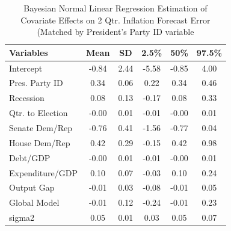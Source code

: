 \documentclass[a4paper]{article}\usepackage{graphicx, color}
\begin{document}
\begin{table}[ht]
\begin{center}
\caption{Bayesian Normal Linear Regression Estimation of Covariate Effects on 2 Qtr. Inflation Forecast Error (Matched by President's Party ID variable}
\label{OutputPB}
{\small
\begin{tabular}{lccccc}
  \hline
Variables & Mean & SD & 2.5\% & 50\% & 97.5\% \\ 
  \hline
Intercept & -0.84 & 2.44 & -5.58 & -0.85 & 4.00 \\ 
  Pres. Party ID & 0.34 & 0.06 & 0.22 & 0.34 & 0.46 \\ 
  Recession & 0.08 & 0.13 & -0.17 & 0.08 & 0.33 \\ 
  Qtr. to Election & -0.00 & 0.01 & -0.01 & -0.00 & 0.01 \\ 
  Senate Dem/Rep & -0.76 & 0.41 & -1.56 & -0.77 & 0.04 \\ 
  House Dem/Rep & 0.42 & 0.29 & -0.15 & 0.42 & 0.98 \\ 
  Debt/GDP & -0.00 & 0.01 & -0.01 & -0.00 & 0.01 \\ 
  Expenditure/GDP & 0.10 & 0.07 & -0.03 & 0.10 & 0.24 \\ 
  Output Gap & -0.01 & 0.03 & -0.08 & -0.01 & 0.05 \\ 
  Global Model & -0.01 & 0.12 & -0.24 & -0.01 & 0.23 \\ 
  sigma2 & 0.05 & 0.01 & 0.03 & 0.05 & 0.07 \\ 
   \hline
\end{tabular}
}
\end{center}
\end{table}





\clearpage



\end{document}

